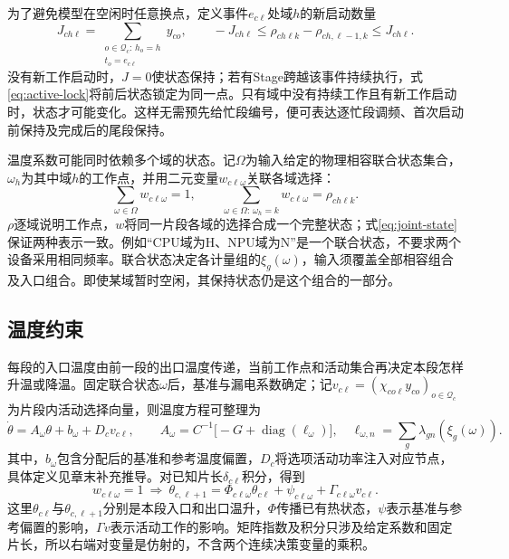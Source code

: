 为了避免模型在空闲时任意换点，定义事件\(e_{c\ell}\)处域\(h\)的新启动数量
\begin{equation}
J_{ch\ell}=\sum_{\substack{o\in\mathcal Q_c:\,h_o=h\\t_o=e_{c\ell}}}y_{co},\qquad
-J_{ch\ell}\le\rho_{ch\ell k}-\rho_{ch,\ell-1,k}\le J_{ch\ell}.
\label{eq:idle-hold}
\end{equation}
没有新工作启动时，\(J=0\)使状态保持；若有Stage跨越该事件持续执行，式\eqref{eq:active-lock}将前后状态锁定为同一点。只有域中没有持续工作且有新工作启动时，状态才可能变化。这样无需预先给忙段编号，便可表达逐忙段调频、首次启动前保持及完成后的尾段保持。

温度系数可能同时依赖多个域的状态。记\(\Omega\)为输入给定的物理相容联合状态集合，\(\omega_h\)为其中域\(h\)的工作点，并用二元变量\(w_{c\ell\omega}\)关联各域选择：
\begin{equation}
\sum_{\omega\in\Omega}w_{c\ell\omega}=1,\qquad
\sum_{\omega\in\Omega:\,\omega_h=k}w_{c\ell\omega}=\rho_{ch\ell k}.
\label{eq:joint-state}
\end{equation}
\(\rho\)逐域说明工作点，\(w\)将同一片段各域的选择合成一个完整状态；式\eqref{eq:joint-state}保证两种表示一致。例如“CPU域为H、NPU域为N”是一个联合状态，不要求两个设备采用相同频率。联合状态决定各计量组的\(\xi_g(\omega)\)，输入须覆盖全部相容组合及入口组合。即使某域暂时空闲，其保持状态仍是这个组合的一部分。

\subsection{温度约束}

每段的入口温度由前一段的出口温度传递，当前工作点和活动集合再决定本段怎样升温或降温。固定联合状态\(\omega\)后，基准与漏电系数确定；记\(v_{c\ell}=(\chi_{co\ell}y_{co})_{o\in\mathcal Q_c}\)为片段内活动选择向量，则温度方程可整理为
\begin{equation}
\dot\theta=A_\omega\theta+b_\omega+D_cv_{c\ell},\qquad
A_\omega=C^{-1}\bigl[-G+\operatorname{diag}(\ell_\omega)\bigr],
\quad \ell_{\omega,n}=\sum_g\lambda_{gn}(\xi_g(\omega)).
\label{eq:state-ode}
\end{equation}
其中，\(b_\omega\)包含分配后的基准和参考温度偏置，\(D_c\)将选项活动功率注入对应节点，具体定义见章末补充推导。对已知片长\(\delta_{c\ell}\)积分，得到
\begin{equation}
w_{c\ell\omega}=1\ \Longrightarrow\
\theta_{c,\ell+1}=\Phi_{c\ell\omega}\theta_{c\ell}
+\psi_{c\ell\omega}+\Gamma_{c\ell\omega}v_{c\ell}.
\label{eq:thermal-transition}
\end{equation}
这里\(\theta_{c\ell}\)与\(\theta_{c,\ell+1}\)分别是本段入口和出口温升，\(\Phi\)传播已有热状态，\(\psi\)表示基准与参考偏置的影响，\(\Gamma v\)表示活动工作的影响。矩阵指数及积分只涉及给定系数和固定片长，所以右端对变量是仿射的，不含两个连续决策变量的乘积。

